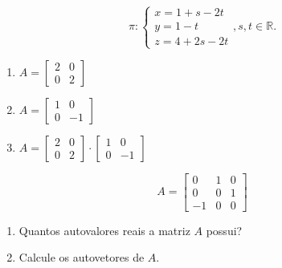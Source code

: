 \documentclass{prova}
\begin{document}
\begin{questionario}
            \[\pi:\left\{\begin{array}{l}
		    		x = 1+s-2t \\
		    		y = 1-t \\
		    		z = 4+2s-2t
            \end{array}\right., s, t\in{} \mathbb{R}.\]
	    	\begin{enumerate}
	    		\vspace{0.3cm}
	    		\item $A = \left[\begin{array}{cc}
	    					2 & 0 \\
	    					0 & 2
	    				\end{array}\right]$
	    		\vspace{0.3cm}
	    		\item $A = \left[\begin{array}{cc}
	    					1 & 0 \\
	    					0 & -1
	    				\end{array}\right]$
	    		\vspace{0.3cm}
	    		\item $A = \left[\begin{array}{cc}
	    					2 & 0 \\
	    					0 & 2
	    				\end{array}\right]\cdot
	    				\left[\begin{array}{cc}
	    					1 & 0 \\
	    					0 & -1
	    				\end{array}\right]$
	    	\end{enumerate}
	    	\[A = \left[\begin{array}{ccc}
	    			0 & 1 & 0 \\
	    			0 & 0 & 1 \\
	    			-1 & 0 & 0
	    		\end{array}\right]\]
	    	\begin{enumerate}
	    		\vspace{0.3cm}
	    		\item Quantos autovalores reais a matriz $A$ possui?
	    		\vspace{0.3cm}
	    		\item Calcule os autovetores de $A$.
	    	\end{enumerate}
    \end{questionario}
\end{document}
